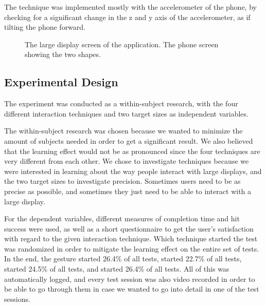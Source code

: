The \tilt technique was implemented mostly with the accelerometer of the phone, by checking for a significant change in the z and y axis of the accelerometer, as if tilting the phone forward. 

\begin{figure}[H]
	\centering
	\qquad
	\caption{
		\protect{} The large display screen of the application.
		\protect{} The phone screen showing the two shapes.
	}
	\label{fig:allSetup}
\end{figure} 

\subsection{Experimental Design}\label{sec:expdesign}
The experiment was conducted as a within-subject research, with the four different interaction techniques and two target sizes as independent variables. 

The within-subject research was chosen because we wanted to minimize the amount of subjects needed in order to get a significant result. We also believed that the learning effect would not be as pronounced since the four techniques are very different from each other. 
We chose to investigate techniques because we were interested in learning about the way people interact with large displays, and the two target sizes to investigate precision. Sometimes users need to be as precise as possible, and sometimes they just need to be able to interact with a large display. 

For the dependent variables, different measures of completion time and hit success were used, as well as a short questionnaire to get the user's satisfaction with regard to the given interaction technique. 
Which technique started the test was randomized in order to mitigate the learning effect on the entire set of tests. 
In the end, the \pinch gesture started 26.4\% of all tests, \swipe started 22.7\% of all tests, \throw started 24.5\% of all tests, and \tilt started 26.4\% of all tests. 
All of this was automatically logged, and every test session was also video recorded in order to be able to go through them in case we wanted to go into detail in one of the test sessions.

